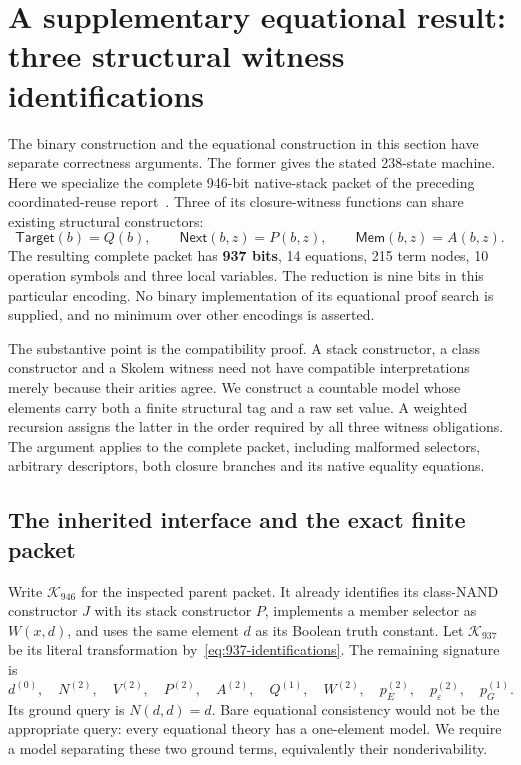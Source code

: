 \section{A supplementary equational result: three structural witness identifications}
\label{sec:stack937}

The binary construction and the equational construction in this section
have separate correctness arguments.  The former gives the stated
238-state machine.  Here we specialize the complete 946-bit native-stack
packet of the preceding coordinated-reuse report~\cite{coordinated239}.
Three of its closure-witness functions can share existing structural
constructors:
\begin{equation}
 \mathsf{Target}(b)=Q(b),\qquad
 \mathsf{Next}(b,z)=P(b,z),\qquad
 \mathsf{Mem}(b,z)=A(b,z).
 \label{eq:937-identifications}
\end{equation}
The resulting complete packet has \textbf{937 bits}, 14 equations,
215 term nodes, 10 operation symbols and three local variables.
The reduction is nine bits in this particular encoding.  No binary
implementation of its equational proof search is supplied, and no
minimum over other encodings is asserted.

The substantive point is the compatibility proof.  A stack constructor,
a class constructor and a Skolem witness need not have compatible
interpretations merely because their arities agree.  We construct a
countable model whose elements carry both a finite structural tag and a
raw set value.  A weighted recursion assigns the latter in the order
required by all three witness obligations.  The argument applies to the
complete packet, including malformed selectors, arbitrary descriptors,
both closure branches and its native equality equations.

\subsection{The inherited interface and the exact finite packet}

Write \(\mathcal K_{946}\) for the inspected parent packet.  It already
identifies its class-NAND constructor \(J\) with its stack constructor
\(P\), implements a member selector as \(W(x,d)\), and uses the same
element \(d\) as its Boolean truth constant.  Let \(\mathcal K_{937}\)
be its literal transformation by~\eqref{eq:937-identifications}.
The remaining signature is
\[
 d^{(0)},\quad N^{(2)},\quad V^{(2)},\quad P^{(2)},\quad
 A^{(2)},\quad Q^{(1)},\quad W^{(2)},\quad
 p_E^{(2)},\quad p_\varepsilon^{(2)},\quad p_G^{(1)}.
\]
Its ground query is \(N(d,d)=d\).  Bare equational consistency would
not be the appropriate query: every equational theory has a one-element
model.  We require a model separating these two ground terms,
equivalently their nonderivability.

